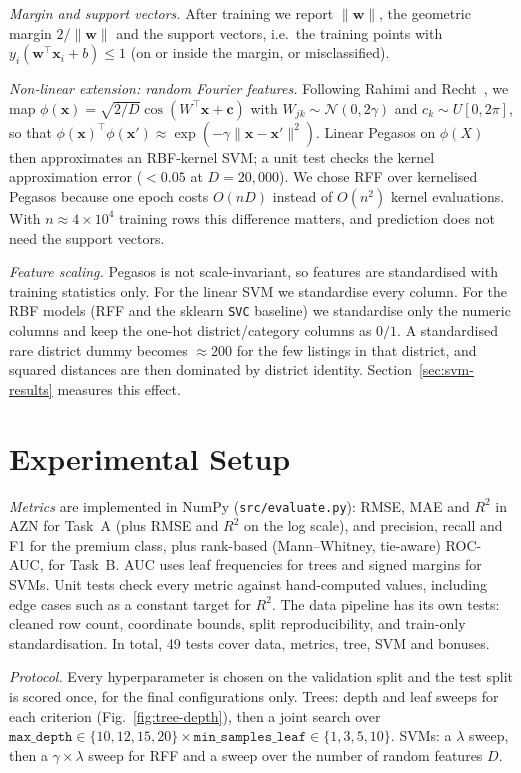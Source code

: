 \documentclass[10pt,twocolumn,a4paper]{article}
\begin{document}
\emph{Margin and support vectors.} After training we report
$\lVert\mathbf{w}\rVert$, the geometric margin $2/\lVert\mathbf{w}\rVert$
and the support vectors, i.e.\ the training points with
$y_i(\mathbf{w}^{\top}\mathbf{x}_i+b)\le 1$ (on or inside the margin, or
misclassified).

\emph{Non-linear extension: random Fourier features.} Following
Rahimi and Recht~\cite{rff}, we map
$\phi(\mathbf{x})=\sqrt{2/D}\cos(W^{\top}\mathbf{x}+\mathbf{c})$ with
$W_{jk}\sim\mathcal N(0,2\gamma)$ and $c_k\sim U[0,2\pi]$, so that
$\phi(\mathbf{x})^{\top}\phi(\mathbf{x}')\approx
\exp(-\gamma\lVert\mathbf{x}-\mathbf{x}'\rVert^{2})$. Linear Pegasos on
$\phi(X)$ then approximates an RBF-kernel SVM; a unit test checks the
kernel approximation error ($<0.05$ at $D=20{,}000$). We chose RFF over
kernelised Pegasos because one epoch costs $O(nD)$ instead of $O(n^{2})$
kernel evaluations. With $n\approx 4\times10^{4}$ training rows this
difference matters, and prediction does not need the support vectors.

\emph{Feature scaling.} Pegasos is not scale-invariant, so features are
standardised with training statistics only. For the linear SVM we
standardise every column. For the RBF models (RFF and the sklearn
\texttt{SVC} baseline) we standardise only the numeric columns and keep
the one-hot district/category columns as $0/1$. A standardised rare
district dummy becomes $\approx 200$ for the few listings in that
district, and squared distances are then dominated by district
identity. Section~\ref{sec:svm-results} measures this effect.

\section{Experimental Setup}
\emph{Metrics} are implemented in NumPy (\texttt{src/evaluate.py}):
RMSE, MAE and $R^2$ in AZN for Task~A (plus RMSE and $R^2$ on the log
scale), and precision, recall and F1 for the premium class, plus
rank-based (Mann--Whitney, tie-aware) ROC-AUC, for Task~B. AUC uses leaf
frequencies for trees and signed margins for SVMs. Unit tests check
every metric against hand-computed values, including edge cases such as a
constant target for $R^2$. The data pipeline has its own tests: cleaned
row count, coordinate bounds, split reproducibility, and train-only
standardisation. In total, 49 tests cover data, metrics, tree, SVM and
bonuses.

\emph{Protocol.} Every hyperparameter is chosen on the validation split
and the test split is scored once, for the final configurations only.
Trees: depth and leaf sweeps for each criterion
(Fig.~\ref{fig:tree-depth}), then a joint search over
$\texttt{max\_depth}\in\{10,12,15,20\}\times
\texttt{min\_samples\_leaf}\in\{1,3,5,10\}$. SVMs: a $\lambda$ sweep, then
a $\gamma\times\lambda$ sweep for RFF and a sweep over the number of
random features $D$.
\end{document}
